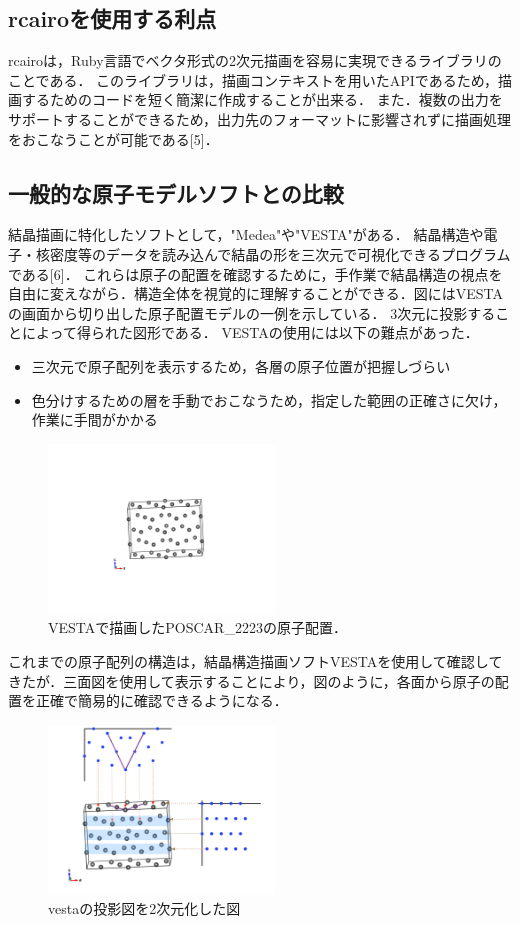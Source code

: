 \subsection{rcairoを使用する利点}
rcairoは，Ruby言語でベクタ形式の2次元描画を容易に実現できるライブラリのことである．
このライブラリは，描画コンテキストを用いたAPIであるため，描画するためのコードを短く簡潔に作成することが出来る．
また．複数の出力をサポートすることができるため，出力先のフォーマットに影響されずに描画処理をおこなうことが可能である[5]．

\subsection{一般的な原子モデルソフトとの比較}
結晶描画に特化したソフトとして，"Medea"や"VESTA"がある．
結晶構造や電子・核密度等のデータを読み込んで結晶の形を三次元で可視化できるプログラムである[6]．
これらは原子の配置を確認するために，手作業で結晶構造の視点を自由に変えながら．構造全体を視覚的に理解することができる．図にはVESTAの画面から切り出した原子配置モデルの一例を示している．
3次元に投影することによって得られた図形である．
VESTAの使用には以下の難点があった．

\begin{itemize}
\item 三次元で原子配列を表示するため，各層の原子位置が把握しづらい
\item 色分けするための層を手動でおこなうため，指定した範囲の正確さに欠け，作業に手間がかかる
\end{itemize}
\begin{figure}[htbp]\begin{center}
\includegraphics[width=6cm,bb=0 0 442 432]{../figs/./boundary_narita.006.jpg}
\caption{VESTAで描画したPOSCAR\_2223の原子配置．}
\label{default}\end{center}\end{figure}
これまでの原子配列の構造は，結晶構造描画ソフトVESTAを使用して確認してきたが．三面図を使用して表示することにより，図のように，各面から原子の配置を正確で簡易的に確認できるようになる．

\begin{figure}[htbp]\begin{center}
\includegraphics[width=6cm,bb=0 0 442 432]{../figs/./boundary_narita.007.jpg}
\caption{vestaの投影図を2次元化した図}
\label{default}\end{center}\end{figure}
